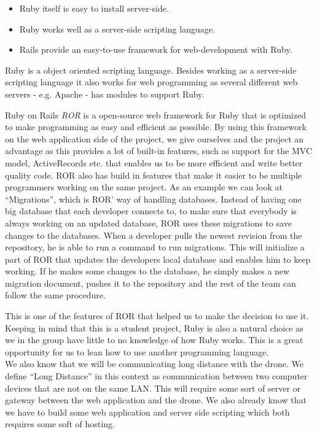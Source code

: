 \begin{itemize}
	\item Ruby itself is easy to install server-side.
	\item Ruby works well as a server-side scripting language.
	\item Rails provide an easy-to-use framework for web-development with Ruby.
\end{itemize}

Ruby is a object oriented scripting language.
Besides working as a server-side scripting language it also works for web programming as several different web servers - e.g. Apache - has modules to support Ruby.

Ruby on Rails \emph{ROR} is a open-source web framework for Ruby that is optimized to make programming as easy and efficient as possible.
By using this framework on the web application side of the project, we give ourselves and the project an advantage as this provides a lot of built-in features, such as support for the MVC model, ActiveRecords etc. that enables us to be more efficient and write better quality code.
ROR also has build in features that make it easier to be multiple programmers working on the same project.
As an example we can look at ``Migrations'', which is ROR' way of handling databases.
Instead of having one big database that each developer connects to, to make sure that everybody is always working on an updated database, ROR uses these migrations to save changes to the databases.
When a developer pulls the newest revision from the repository, he is able to run a command to run migrations.
This will initialize a part of ROR that updates the developers local database and enables him to keep working.
If he makes some changes to the database, he simply makes a new migration document, pushes it to the repository and the rest of the team can follow the same procedure.

This is one of the features of ROR that helped us to make the decision to use it. \\

Keeping in mind that this is a student project, Ruby is also a natural choice as we in the group have little to no knowledge of how Ruby works.
This is a great opportunity for us to lean how to use another programming language. \\

We also know that we will be communicating long distance with the drone.
We define ``Long Distance'' in this context as communication between two computer devices that are not on the same LAN. 
This will require some sort of server or gateway between the web application and the drone.
We also already know that we have to build some web application and server side scripting which both requires some soft of hosting.




